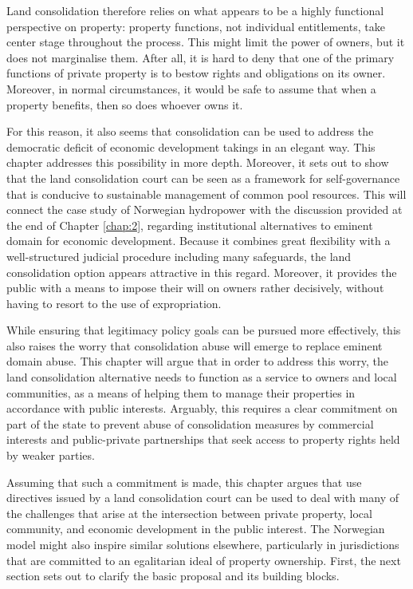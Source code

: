 Land consolidation therefore relies on what appears to be a highly functional perspective on property: property functions, not individual entitlements, take center stage throughout the process. This might limit the power of owners, but it does not marginalise them. After all, it is hard to deny that one of the primary functions of private property is to bestow rights and obligations on its owner. Moreover, in normal circumstances, it would be safe to assume that when a property benefits, then so does whoever owns it.

For this reason, it also seems that consolidation can be used to address the democratic deficit of economic development takings in an elegant way. This chapter addresses this possibility in more depth. Moreover, it sets out to show that the land consolidation court can be seen as a framework for self-governance that is conducive to sustainable management of common pool resources. This will connect the case study of Norwegian hydropower with the discussion provided at the end of Chapter \ref{chap:2}, regarding institutional alternatives to eminent domain for economic development. Because it combines great flexibility with a well-structured judicial procedure including many safeguards, the land consolidation option appears attractive in this regard. Moreover, it provides the public with a means to impose their will on owners rather decisively, without having to resort to the use of expropriation. 

While ensuring that legitimacy policy goals can be pursued more effectively, this also raises the worry that consolidation abuse will emerge to replace eminent domain abuse. This chapter will argue that in order to address this worry, the land consolidation alternative needs to function as a service to owners and local communities, as a means of helping them to manage their properties in accordance with public interests. Arguably, this requires a clear commitment on part of the state to prevent abuse of consolidation measures by commercial interests and public-private partnerships that seek access to property rights held by weaker parties.

Assuming that such a commitment is made, this chapter argues that use directives issued by a land consolidation court can be used to deal with many of the challenges that arise at the intersection between private property, local community, and economic development in the public interest. The Norwegian model might also inspire similar solutions elsewhere, particularly in jurisdictions that are committed to an egalitarian ideal of property ownership. First, the next section sets out to clarify the basic proposal and its building blocks.

